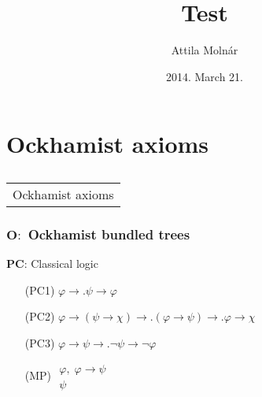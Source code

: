 \documentclass[xcolor=x11names]{beamer}
\author{Attila Moln\'ar}
\date{2014. March 21.}
\title{Test}
\institute{ELTE}
\makeatletter
\let\beamer@writeslidentry@miniframeson=\beamer@writeslidentry
\def\beamer@writeslidentry@miniframesoff{%
  \expandafter\beamer@ifempty\expandafter{\beamer@framestartpage}{}%
  {%
    \clearpage\beamer@notesactions%
  }
}
\newcommand*{\miniframeson}{\let\beamer@writeslidentry=\beamer@writeslidentry@miniframeson}
\newcommand*{\miniframesoff}{\let\beamer@writeslidentry=\beamer@writeslidentry@miniframesoff}
\newcommand{\cimdia}[1] {\miniframesoff \begin{frame}\begin{center}\huge \begin{tabular}{c}#1\end{tabular}\end{center}\end{frame}\miniframeson}
\newcommand{\szakasz}[2][]{\section{#1}\subsection{}\cimdia{#2}}
\newcommand{\bemph}[1] {{\color{DeepSkyBlue3}{#1}}}
\newcommand{\FD}{\mathbf F}
\newcommand{\PD}{\mathbf P}
\renewcommand{\Diamond}{\scalebox{.9}{\raisebox{-.4ex}{\rotatebox{45}{$\Box$}}}}
\newcommand{\lrule}[3][c]{\begin{array}{#1} #2  \\  \hline #3 \end{array}}
\newcommand{\defegy}[1][.1]{\hspace{#1cm}\overset{\textup{\tiny def}}{=}\hspace{#1cm}}
\newcommand{\lthen}{\rightarrow}
\makeatother
\begin{document}
\footnotesize


\szakasz[Ockhamist axioms]{Ockhamist axioms}

\begin{frame}[t]
\frametitle{$\mathbf O:$%
Ockhamist bundled trees}
\scriptsize
\begin{minipage}[t]{5.78cm}
$\mathbf{PC}$: {Classical logic}
\begin{itemize}
\item[(PC1)] $\varphi \lthen .\psi \lthen \varphi$
\item[(PC2)] $\varphi\lthen (\psi \lthen \chi) \lthen\!\!. (\varphi \lthen \psi) \lthen\!\! . \varphi \lthen \chi$
\item[(PC3)] $\varphi \lthen \psi \lthen .\lnot \psi \lthen \lnot \varphi$
\item[(MP)] $\lrule {\varphi , \; \varphi \lthen \psi}{\psi}$
\end{itemize}
\pause %
\bemph{\hrule}
\smallskip


\end{minipage}
\end{frame}
\end{document}
